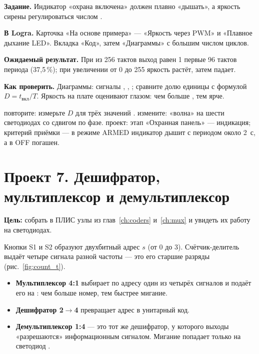 \begin{diybox}
\textbf{Задание.} Индикатор «охрана включена» должен плавно «дышать», а яркость сирены регулироваться числом .

\textbf{В Logra.} Карточка «На основе примера» --- «Яркость через PWM» и «Плавное дыхание LED». Вкладка «Код», затем «Диаграммы» с большим числом циклов.

\textbf{Ожидаемый результат.} При  из 256 тактов выход равен 1 первые 96 тактов периода (37,5\,\%); при увеличении  от 0 до 255 яркость растёт, затем падает.

\textbf{Как проверить.} Диаграммы: сигналы , , ; сравните долю единицы с формулой $D=t_\text{вкл}/T$. Яркость на плате оценивают глазом: чем больше , тем ярче.

 повторите: измерьте $D$ для трёх значений .  измените: «волна» на шести светодиодах со сдвигом по фазе.  проект: этап «Охранная панель» --- индикация; критерий приёмки --- в режиме ARMED индикатор дышит с периодом около 2~с, а в OFF погашен.
\end{diybox}

\section{Проект 7. Дешифратор, мультиплексор и демультиплексор}

\textbf{Цель:} собрать в ПЛИС узлы из глав~\ref{ch:coders} и~\ref{ch:mux} и
увидеть их работу на светодиодах.

Кнопки S1 и S2 образуют двухбитный адрес $s$ (от 0 до 3). Счётчик-делитель
выдаёт четыре сигнала разной частоты --- это его старшие разряды
(рис.~\ref{fig:count_t}).
\begin{itemize}
  \item \textbf{Мультиплексор 4:1} выбирает по адресу один из четырёх сигналов
        и подаёт его на : чем больше номер, тем быстрее мигание.
  \item \textbf{Дешифратор 2$\to$4} превращает адрес в унитарный код.
  \item \textbf{Демультиплексор 1:4} --- это тот же дешифратор, у которого
        выходы «разрешаются» информационным сигналом. Мигание попадает только
        на светодиод .
\end{itemize}

